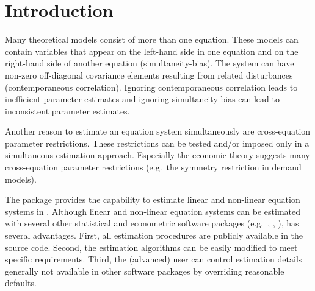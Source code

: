 


\section{Introduction}

Many theoretical models consist of more than one equation.
These models can contain variables that appear on the left-hand side in one
equation and on the right-hand side of another equation (simultaneity-bias).
The system can have non-zero off-diagonal covariance elements resulting from
related disturbances (contemporaneous correlation).
Ignoring contemporaneous correlation leads to inefficient parameter
estimates \citep{zellner62} and ignoring simultaneity-bias can lead to
inconsistent parameter estimates.


Another reason to estimate an equation system simultaneously are
cross-equation parameter restrictions.
These restrictions can be tested and/or imposed only in a simultaneous
estimation approach.
Especially the economic theory suggests many cross-equation parameter
restrictions (e.g.\ the symmetry restriction in demand models).



The  package provides the capability to estimate
linear and non-linear equation systems in 
\citep{r-project}.
Although linear and non-linear equation systems can be estimated
with several other statistical and econometric software packages
(e.g.\ , , ),
 has several advantages.
First, all estimation procedures are publicly available in the source code.
Second, the estimation algorithms can be easily modified to meet specific
requirements.
Third, the (advanced) user can control estimation details generally
not available in other software packages by overriding reasonable defaults.

